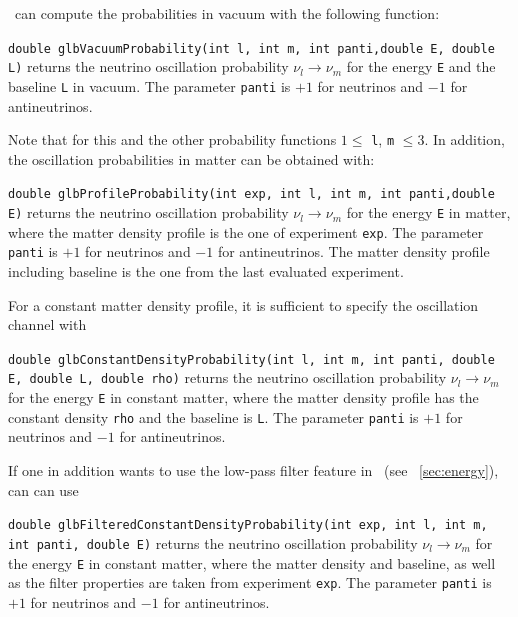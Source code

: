 \GLOBES\ can compute the probabilities in vacuum
with the following function:
\begin{function}
{\tt double glbVacuumProbability(int l, int m, int panti,double E, double L)} returns the neutrino oscillation probability $\nu_l \rightarrow \nu_m$ for the energy {\tt E} and the baseline {\tt L} in vacuum. The parameter
{\tt panti} is $+1$ for neutrinos and $-1$ for antineutrinos. 
\end{function}
Note that for this and the other probability functions $1 \le$ {\tt l}, {\tt m} $\le 3$.
In addition, the oscillation probabilities in matter can be obtained
with:
\begin{function}
{\tt double glbProfileProbability(int exp, int l, int m, int panti,double E)} returns the neutrino oscillation probability $\nu_l \rightarrow \nu_m$ for the energy {\tt E} in matter, where the matter density profile
is the one of experiment {\tt exp}. The parameter
{\tt panti} is $+1$ for neutrinos and $-1$ for antineutrinos.
The matter density profile including baseline is the one from the last
evaluated experiment. 
\end{function}
For a constant matter density profile, it is sufficient to specify the oscillation channel with
\begin{function}
{\tt double glbConstantDensityProbability(int l, int m, int panti, double E, double L, double rho)} returns the neutrino oscillation probability $\nu_l \rightarrow \nu_m$ for the energy {\tt E} in constant matter, where the matter density profile
has the constant density {\tt rho} and the baseline is {\tt L}. The parameter
{\tt panti} is $+1$ for neutrinos and $-1$ for antineutrinos.
\end{function}
If one in addition wants to use the low-pass filter feature in \GLOBES\ (see \Sec~\ref{sec:energy}), can can use
\begin{function}
{\tt double glbFilteredConstantDensityProbability(int exp, int l, int m, int panti, double E)} returns the neutrino oscillation probability $\nu_l \rightarrow \nu_m$ for the energy {\tt E} in constant matter, where the matter density and baseline, as well as the filter properties are taken from experiment {\tt exp}. The parameter {\tt panti} is $+1$ for neutrinos and $-1$ for antineutrinos.
\end{function}

